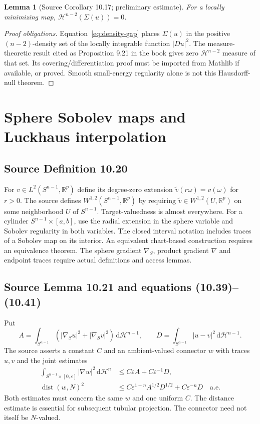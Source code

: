 \documentclass[11pt,a4paper]{article}
\numberwithin{equation}{section}
\newtheorem{lemma}[theorem]{Lemma}
\theoremstyle{definition}
\theoremstyle{remark}
\newcommand{\R}{\mathbb R}
\newcommand{\HH}{\mathcal H}
\newcommand{\dd}{\,\mathrm d}
\newcommand{\dist}{\operatorname{dist}}
\begin{document}
\begin{lemma}[Source Corollary 10.17; preliminary estimate]
\label{lem:singular-null}
For a locally minimizing map, $\HH^{n-2}(\Sigma(u))=0$.
\end{lemma}
\begin{proof}[Proof obligations]
Equation~\eqref{eq:density-gap} places $\Sigma(u)$ in the positive
$(n-2)$-density set of the locally integrable function $|Du|^2$.
The measure-theoretic result cited as Proposition 9.21 in the book gives
zero $\HH^{n-2}$ measure of that set. Its covering/differentiation proof
must be imported from Mathlib if available, or proved. Smooth small-energy
regularity alone is not this Hausdorff-null theorem.
\end{proof}

\section{Sphere Sobolev maps and Luckhaus interpolation}
\subsection{Source Definition 10.20}\label{def:sphere-sobolev}
For $v\in L^2(S^{n-1},\R^p)$ define its degree-zero extension
$\widetilde v(r\omega)=v(\omega)$ for $r>0$. The source defines
$W^{1,2}(S^{n-1},\R^p)$ by requiring $\widetilde v\in W^{1,2}(U,\R^p)$
on some neighborhood $U$ of $S^{n-1}$. Target-valuedness is almost
everywhere. For a cylinder $S^{n-1}\times[a,b]$, use the radial extension
in the sphere variable and Sobolev regularity in both variables. The closed
interval notation includes traces of a Sobolev map on its interior.
An equivalent chart-based construction requires an equivalence theorem.
The sphere gradient $\nabla_S$, product gradient $\nabla$ and endpoint
traces require actual definitions and access lemmas.

\subsection{Source Lemma 10.21 and equations (10.39)--(10.41)}
\label{lem:luckhaus}
Put
\[
 A=\int_{S^{n-1}}(|\nabla_Su|^2+|\nabla_Sv|^2)\dd\HH^{n-1},\qquad
 D=\int_{S^{n-1}}|u-v|^2\dd\HH^{n-1}.
\]
The source asserts a constant $C$ and an ambient-valued connector $w$ with
traces $u,v$ and the joint estimates
\begin{align}
 \int_{S^{n-1}\times[0,\varepsilon]}|\nabla w|^2\dd\HH^n
 &\le C\varepsilon A+C\varepsilon^{-1}D,\label{eq:luckhaus-energy}\\
 \dist(w,N)^2
 &\le C\varepsilon^{1-n}A^{1/2}D^{1/2}
       +C\varepsilon^{-n}D\quad\text{a.e.}\label{eq:luckhaus-distance}
\end{align}
Both estimates must concern the same $w$ and one uniform $C$.
The distance estimate is essential for subsequent tubular projection.
The connector need not itself be $N$-valued.
\end{document}

